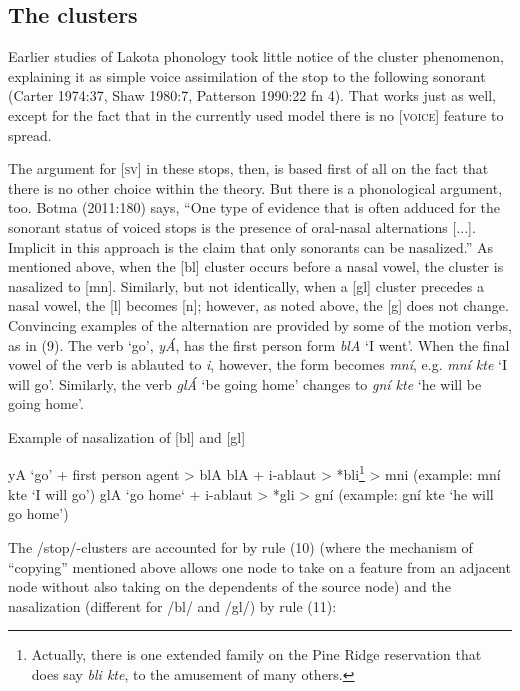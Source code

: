 \documentclass[output=paper]{LSP/langsci}
\begin{document}
\subsection{The clusters}

Earlier studies of Lakota phonology took little notice of the cluster phenomenon, explaining it as simple voice assimilation of the stop to the following sonorant (Carter 1974:37, Shaw 1980:7, Patterson 1990:22 fn 4). That works just as well, except for the fact that in the currently used model there is no [\textsc{voice}] feature to spread.

The argument for [\textsc{sv}] in these stops, then, is based first of all on the fact that there is no other choice within the theory. But there is a phonological argument, too. Botma (2011:180) says, ``One type of evidence that is often adduced for the sonorant status of voiced stops is the presence of oral-nasal alternations [...]. Implicit in this approach is the claim that only sonorants can be nasalized.'' As mentioned above, when the [bl] cluster occurs before a nasal vowel, the cluster is nasalized to [mn]. Similarly, but not identically, when a [gl] cluster precedes a nasal vowel, the [l] becomes [n]; however, as noted above, the [g] does not change. Convincing examples of the alternation are provided by some of the motion verbs, as in (9). The verb `go', \textit{y\'A}, has the first person form \textit{blA} `I went'. When the final vowel of the verb is ablauted to \textit{i}, however, the form becomes \textit{mn\'i}, e.g. \textit{mn\'i kte} `I will go'. Similarly, the verb \textit{gl\'A} `be going home' changes to \textit{gn\'i kte} `he will be going home'.

\begin{exe}
\ex Example of nasalization of [bl] and [gl]
\begin{xlist}
\ex yA `go' + first person agent > blA
\ex blA + i-ablaut > *bli\footnote{Actually, there is one extended family on the Pine Ridge reservation that does say \textit{bli kte}, to the amusement of many others.} > mni (example: mn\'i kte `I will go')
\ex glA `go home` + i-ablaut > *gli > gn\'i (example: gn\'i kte `he will go home')
\end{xlist}
\end{exe}

The /stop/-clusters are accounted for by rule (10) (where the mechanism of ``copying'' mentioned above allows one node to take on a feature from an adjacent node without also taking on the dependents of the source node) and the nasalization (different for /bl/ and /gl/) by rule (11):
\end{document}
